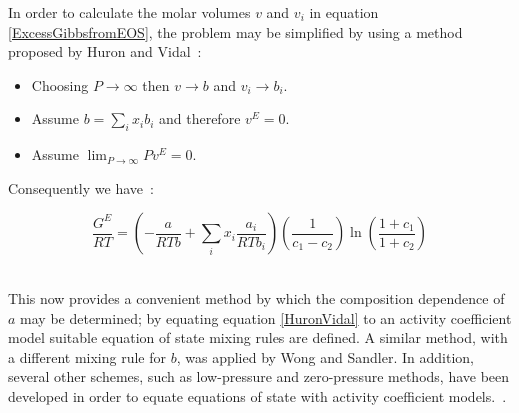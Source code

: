 In order to calculate the molar volumes $v$ and $v_{i}$ in equation \ref{ExcessGibbsfromEOS}, the problem may be simplified by using a method proposed by Huron and Vidal~\cite{HuronVidal, Vidal}:\
\begin{itemize}
 \item Choosing $P \rightarrow \infty$ then $v \rightarrow b$ and $v_{i} \rightarrow b_{i}$.\
 \item Assume $b = \sum_{i}x_{i}b_{i}$ and therefore $v^{E} = 0$.\
 \item Assume $ \lim_{P\rightarrow \infty} Pv^{E} = 0 $.\
 \end{itemize}
 Consequently we have~\cite{HuronVidal}:\
 
\begin{equation}
\dfrac{G^{E}}{RT} = \left( -\dfrac{a}{RTb} + \sum_{i} x_{i}\dfrac{a_{i}}{RTb_{i}}\right)\left(\dfrac{1}{c_{1}- c_{2}}\right)\ln\left(\dfrac{1+c_{1}}{1+ c_{2}}\right) \label{HuronVidal}
\end{equation}\

This now provides a convenient method by which the composition dependence of $a$ may be determined; by equating equation \ref{HuronVidal} to an activity coefficient model suitable equation of state mixing rules are defined. A similar method, with a different mixing rule for $b$, was applied by Wong and Sandler. In addition, several other schemes, such as low-pressure and zero-pressure methods, have been developed in order to equate equations of state with activity coefficient models.~\cite{WongSandler, Focke, ThermophysicalProperties, ActivityCoefficientEOSModels}.





